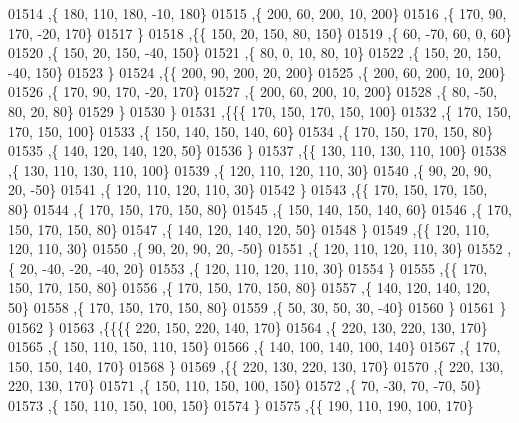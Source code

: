 \begin{DoxyCode}
01514     ,\{   180,   110,   180,   -10,   180\}
01515     ,\{   200,    60,   200,    10,   200\}
01516     ,\{   170,    90,   170,   -20,   170\}
01517     \}
01518    ,\{\{   150,    20,   150,    80,   150\}
01519     ,\{    60,   -70,    60,     0,    60\}
01520     ,\{   150,    20,   150,   -40,   150\}
01521     ,\{    80,     0,    10,    80,    10\}
01522     ,\{   150,    20,   150,   -40,   150\}
01523     \}
01524    ,\{\{   200,    90,   200,    20,   200\}
01525     ,\{   200,    60,   200,    10,   200\}
01526     ,\{   170,    90,   170,   -20,   170\}
01527     ,\{   200,    60,   200,    10,   200\}
01528     ,\{    80,   -50,    80,    20,    80\}
01529     \}
01530    \}
01531   ,\{\{\{   170,   150,   170,   150,   100\}
01532     ,\{   170,   150,   170,   150,   100\}
01533     ,\{   150,   140,   150,   140,    60\}
01534     ,\{   170,   150,   170,   150,    80\}
01535     ,\{   140,   120,   140,   120,    50\}
01536     \}
01537    ,\{\{   130,   110,   130,   110,   100\}
01538     ,\{   130,   110,   130,   110,   100\}
01539     ,\{   120,   110,   120,   110,    30\}
01540     ,\{    90,    20,    90,    20,   -50\}
01541     ,\{   120,   110,   120,   110,    30\}
01542     \}
01543    ,\{\{   170,   150,   170,   150,    80\}
01544     ,\{   170,   150,   170,   150,    80\}
01545     ,\{   150,   140,   150,   140,    60\}
01546     ,\{   170,   150,   170,   150,    80\}
01547     ,\{   140,   120,   140,   120,    50\}
01548     \}
01549    ,\{\{   120,   110,   120,   110,    30\}
01550     ,\{    90,    20,    90,    20,   -50\}
01551     ,\{   120,   110,   120,   110,    30\}
01552     ,\{    20,   -40,   -20,   -40,    20\}
01553     ,\{   120,   110,   120,   110,    30\}
01554     \}
01555    ,\{\{   170,   150,   170,   150,    80\}
01556     ,\{   170,   150,   170,   150,    80\}
01557     ,\{   140,   120,   140,   120,    50\}
01558     ,\{   170,   150,   170,   150,    80\}
01559     ,\{    50,    30,    50,    30,   -40\}
01560     \}
01561    \}
01562   \}
01563  ,\{\{\{\{   220,   150,   220,   140,   170\}
01564     ,\{   220,   130,   220,   130,   170\}
01565     ,\{   150,   110,   150,   110,   150\}
01566     ,\{   140,   100,   140,   100,   140\}
01567     ,\{   170,   150,   150,   140,   170\}
01568     \}
01569    ,\{\{   220,   130,   220,   130,   170\}
01570     ,\{   220,   130,   220,   130,   170\}
01571     ,\{   150,   110,   150,   100,   150\}
01572     ,\{    70,   -30,    70,   -70,    50\}
01573     ,\{   150,   110,   150,   100,   150\}
01574     \}
01575    ,\{\{   190,   110,   190,   100,   170\}

\end{DoxyCode}

